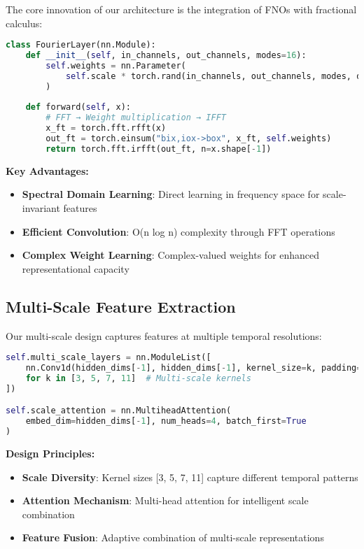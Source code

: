 \documentclass[11pt,a4paper]{article}
\begin{document}
The core innovation of our architecture is the integration of FNOs with fractional calculus:

\begin{lstlisting}[language=Python, caption=Fourier Layer Implementation]
class FourierLayer(nn.Module):
    def __init__(self, in_channels, out_channels, modes=16):
        self.weights = nn.Parameter(
            self.scale * torch.rand(in_channels, out_channels, modes, dtype=torch.cfloat)
        )
    
    def forward(self, x):
        # FFT → Weight multiplication → IFFT
        x_ft = torch.fft.rfft(x)
        out_ft = torch.einsum("bix,iox->box", x_ft, self.weights)
        return torch.fft.irfft(out_ft, n=x.shape[-1])
\end{lstlisting}

\textbf{Key Advantages:}
\begin{itemize}
    \item \textbf{Spectral Domain Learning}: Direct learning in frequency space for scale-invariant features
    \item \textbf{Efficient Convolution}: O(n log n) complexity through FFT operations
    \item \textbf{Complex Weight Learning}: Complex-valued weights for enhanced representational capacity
\end{itemize}

\subsection{Multi-Scale Feature Extraction}

Our multi-scale design captures features at multiple temporal resolutions:

\begin{lstlisting}[language=Python, caption=Multi-Scale Layer Design]
self.multi_scale_layers = nn.ModuleList([
    nn.Conv1d(hidden_dims[-1], hidden_dims[-1], kernel_size=k, padding=k//2)
    for k in [3, 5, 7, 11]  # Multi-scale kernels
])

self.scale_attention = nn.MultiheadAttention(
    embed_dim=hidden_dims[-1], num_heads=4, batch_first=True
)
\end{lstlisting}

\textbf{Design Principles:}
\begin{itemize}
    \item \textbf{Scale Diversity}: Kernel sizes [3, 5, 7, 11] capture different temporal patterns
    \item \textbf{Attention Mechanism}: Multi-head attention for intelligent scale combination
    \item \textbf{Feature Fusion}: Adaptive combination of multi-scale representations
\end{itemize}
\end{document}
